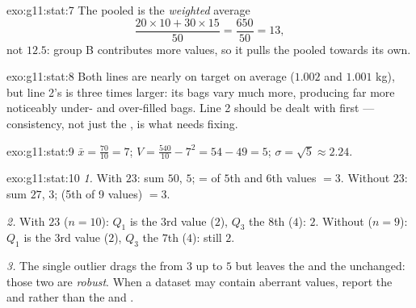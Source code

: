 \begin{solution}{exo:g11:stat:7}
The pooled  is the \emph{weighted} average
\[
\frac{20 \times 10 + 30 \times 15}{50} = \frac{650}{50} = 13,
\]
not $12.5$: group B contributes more values, so it pulls the pooled 
towards its own.
\end{solution}

\begin{solution}{exo:g11:stat:8}
Both lines are nearly on target on average ($1.002$ and $1.001$ kg), but
line 2's  is three times larger: its bags vary much
more, producing far more noticeably under- and over-filled bags. Line 2
should be dealt with first --- consistency, not just the , is what
needs fixing.
\end{solution}

\begin{solution}{exo:g11:stat:9}
$\bar x = \frac{70}{10} = 7$;
$V = \frac{540}{10} - 7^2 = 54 - 49 = 5$;
$\sigma = \sqrt5 \approx 2.24$.
\end{solution}

\begin{solution}{exo:g11:stat:10}
\emph{1.} With $23$: sum $50$,  $5$;  =  of $5$th and
$6$th values $= 3$. Without $23$: sum $27$,  $3$;  (5th of 9
values) $= 3$.

\emph{2.} With $23$ ($n = 10$): $Q_1$ is the $3$rd value ($2$), $Q_3$ the
$8$th ($4$):  $2$. Without ($n = 9$): $Q_1$ is the
$3$rd value ($2$), $Q_3$ the $7$th ($4$): still $2$.

\emph{3.} The single outlier drags the  from $3$ up to $5$ but leaves
the  and the  unchanged: those two are
\emph{robust}. When a dataset may contain aberrant values, report the
 and  rather than the  and .
\end{solution}

